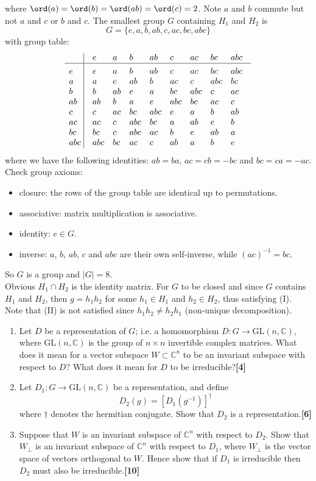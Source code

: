 \documentclass[a4paper]{article}
\begin{document}
\begin{ans}
\begin{enumerate}[label=(\alph*)]
where $\ord(a)=\ord(b)=\ord(ab)=\ord(c)=2$. Note $a$ and $b$ commute but not $a$ and $c$ or $b$ and $c$. The smallest group $G$ containing $H_1$ and $H_2$ is 
$$G=\{e,a,b,ab,c,ac,bc,abc\}$$
with group table:
$$\vbox{\tabskip0.5em\offinterlineskip
    \halign{\strut$#$\hfil\ \tabskip1em\vrule&&$#$\hfil\cr
    ~&e&a&b&ab & c & ac & bc & abc   \cr
    \noalign{\hrule}\vrule height 12pt width 0pt
     e&e&a&b&ab & c & ac & bc & abc   \cr
     a & a& e&ab& b&ac&c&abc&bc \cr
     b & b &ab&e&a&bc&abc&c&ac \cr
     ab & ab&b&a&e&abc&bc&ac&c\cr
     c & c & ac & bc & abc & e & a &b & ab \cr
     ac & ac & c & abc & bc & a & ab & e & b \cr
     bc & bc & c & abc & ac & b & e &ab &a \cr
     abc & abc & bc & ac & c & ab & a & b &e \cr
}}$$
where we have the following identities: $ab=ba$, $ac=cb=-bc$ and $bc=ca=-ac$. Check group axioms:
\begin{itemize}
    \item closure: the rows of the group table are identical up to permutations.
    \item associative: matrix multiplication is associative.
    \item identity: $e\in G$.
    \item inverse: $a$, $b$, $ab$, $c$ and $abc$ are their own self-inverse, while $(ac)^{-1}=bc$.
\end{itemize}
So $G$ is a group and $|G|=8$.\\[5pt]
Obvious $H_1\cap H_2$ is the identity matrix. For $G$ to be closed and since $G$ contains $H_1$ and $H_2$, then $g=h_1h_2$ for some $h_1\in H_1$ and $h_2\in H_2$, thus satisfying (I). Note that (II) is not satisfied since $h_1h_2\neq h_2h_1$ (non-unique decomposition).
\end{enumerate}
\end{ans}
\begin{qns}\leavevmode
\begin{enumerate}[label=(\alph*)]
\item Let $D$ be a representation of $G$; i.e. a homomorphism $D : G\rightarrow \text{GL}(n,\mathbb{C})$, where $\text{GL}(n,\mathbb{C})$ is the group of $n\times n$ invertible complex matrices. What does it mean for a vector subspace $W\subset\mathbb{C}^n$ to be an invariant subspace with respect to $D$? What does it mean for $D$ to be irreducible?\hfill\textbf{[4]}
\item Let $D_1 : G \rightarrow\text{GL}(n,\mathbb{C})$ be a representation, and define 
$$D_2(g) = [D_1(g^{−1})]^\dag$$
where $\dag$ denotes the hermitian conjugate. Show that $D_2$ is a representation.\hfill\textbf{[6]}
\item Suppose that $W$ is an invariant subspace of $\mathbb{C}^n$ with respect to $D_2$. Show that $W_\perp$ is an invariant subspace of $\mathbb{C}^n$ with respect to $D_1$, where $W_\perp$ is the vector space of vectors orthogonal to $W$. Hence show that if $D_1$ is irreducible then $D_2$ must also be irreducible.\hfill\textbf{[10]}
\end{enumerate}
\end{qns}
\end{document}
